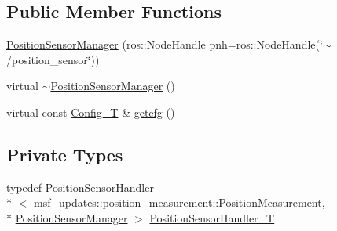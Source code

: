 \subsection*{Public Member Functions}
\begin{DoxyCompactItemize}
\item 
\hyperlink{classmsf__position__sensor_1_1PositionSensorManager_a047ff1426cf128cf8c61487a7d765c87}{Position\-Sensor\-Manager} (ros\-::\-Node\-Handle pnh=ros\-::\-Node\-Handle(\char`\"{}$\sim$/position\-\_\-sensor\char`\"{}))
\item 
virtual \hyperlink{classmsf__position__sensor_1_1PositionSensorManager_a7c282ca8b842e9187dec16d8b674d118}{$\sim$\-Position\-Sensor\-Manager} ()
\item 
virtual const \hyperlink{namespacemsf__position__sensor_a888f7a67abc78bbe9b927b35f1e05933}{Config\-\_\-\-T} \& \hyperlink{classmsf__position__sensor_1_1PositionSensorManager_a84eee4a7b42865f19a29b7ae13bb7dd8}{getcfg} ()
\end{DoxyCompactItemize}
\subsection*{Private Types}
\begin{DoxyCompactItemize}
\item 
typedef Position\-Sensor\-Handler\\*
$<$ msf\-\_\-updates\-::position\-\_\-measurement\-::\-Position\-Measurement, \\*
\hyperlink{classmsf__position__sensor_1_1PositionSensorManager}{Position\-Sensor\-Manager} $>$ \hyperlink{classmsf__position__sensor_1_1PositionSensorManager_afd8d00f9745db7b1b5290f0613ca0eca}{Position\-Sensor\-Handler\-\_\-\-T}
\end{DoxyCompactItemize}
